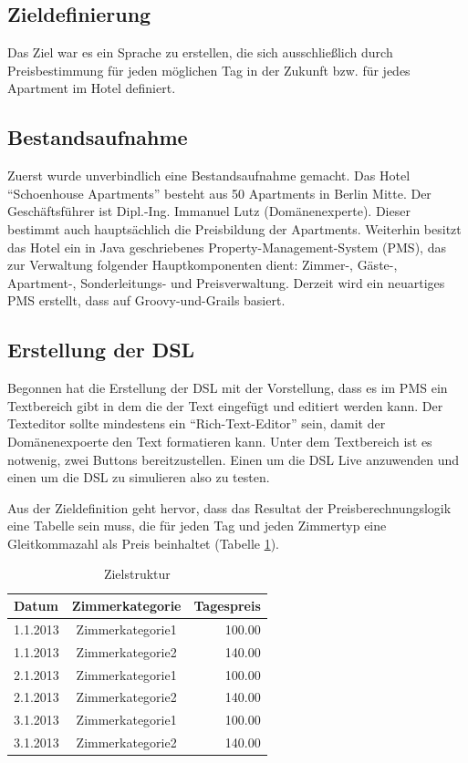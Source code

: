 \documentclass[11pt,english,ngerman, headsepline]{scrreprt}
\begin{document}
\subsection{Zieldefinierung}
Das Ziel war es ein Sprache zu erstellen, die sich ausschließlich durch
Preisbestimmung für jeden möglichen Tag in der Zukunft bzw. für jedes Apartment
im Hotel definiert.
\subsection{Bestandsaufnahme}
Zuerst wurde unverbindlich eine Bestandsaufnahme gemacht. Das Hotel
``Schoenhouse Apartments'' besteht aus 50 Apartments in Berlin Mitte. Der
Geschäftsführer ist Dipl.-Ing. Immanuel Lutz (Domänenexperte). Dieser bestimmt
auch hauptsächlich die Preisbildung der Apartments. Weiterhin besitzt das Hotel ein in Java
geschriebenes Property-Management-System (PMS), das zur Verwaltung folgender
Hauptkomponenten dient: Zimmer-, Gäste-, Apartment-, Sonderleitungs- und
Preisverwaltung.
Derzeit wird ein neuartiges PMS erstellt, dass auf Groovy-und-Grails basiert.
 

\subsection{Erstellung der DSL}
Begonnen hat die Erstellung der DSL mit der Vorstellung, dass es im PMS ein
Textbereich gibt in dem die der Text eingefügt und editiert werden kann.
Der Texteditor sollte mindestens ein ``Rich-Text-Editor'' sein, damit der
Domänenexpoerte den Text formatieren kann.
Unter dem Textbereich ist es notwenig, zwei Buttons bereitzustellen. Einen um
die DSL Live anzuwenden und einen um die DSL zu simulieren also zu testen.

Aus der Zieldefinition geht hervor, dass das Resultat der Preisberechnungslogik
eine Tabelle sein muss, die für jeden Tag und jeden Zimmertyp eine Gleitkommazahl als
Preis beinhaltet (Tabelle \ref{zielDefinition}).  

\begin{table}[htpb]
  \centering
  \begin{tabular}{| l | c | r |} 
 	\hline 
  	Datum & Zimmerkategorie & Tagespreis \\
  	\hline 
	1.1.2013 &  Zimmerkategorie1 &  100.00 \\
	1.1.2013 &  Zimmerkategorie2 &  140.00 \\
	2.1.2013 &  Zimmerkategorie1 &  100.00 \\
	2.1.2013 &  Zimmerkategorie2 &  140.00 \\
	3.1.2013 &  Zimmerkategorie1 &  100.00 \\
	3.1.2013 &  Zimmerkategorie2 &  140.00 \\
	\hline 
  	\end{tabular}  
 	\caption{Zielstruktur}
  \label{zielDefinition}
\end{table}	 
\end{document}
